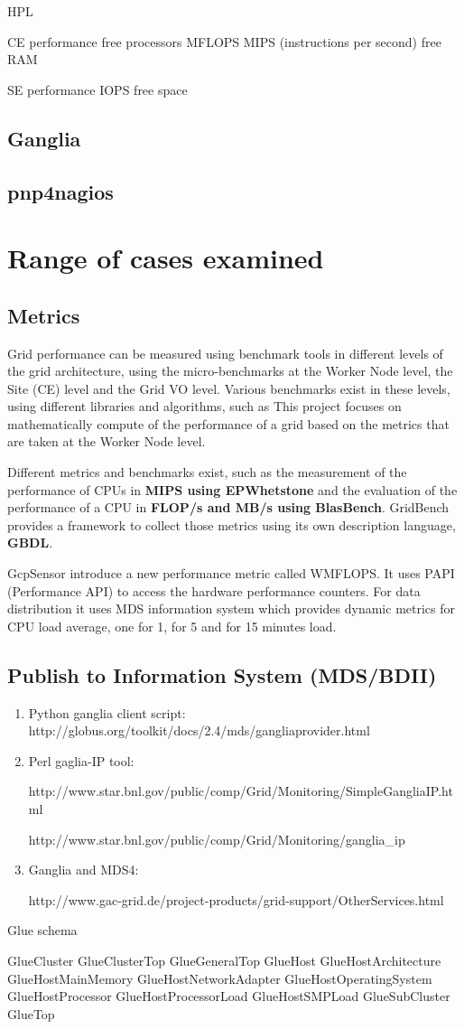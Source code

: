 HPL
\cite{gridbench}

CE performance
free processors
MFLOPS
MIPS (instructions per second)
free RAM

SE performance
IOPS
free space
\subsection{Ganglia}
\subsection{pnp4nagios}

\section{Range of cases examined}
\subsection{Metrics}

Grid performance can be measured using benchmark tools in different levels of
the grid architecture, using the micro-benchmarks at the Worker Node level, the
Site (CE) level and the Grid VO level. Various benchmarks exist in these
levels, using different libraries and algorithms, such as  This project focuses
on mathematically compute of the performance of a grid based on the metrics that are taken at the Worker Node level.

Different metrics and benchmarks exist, such as the measurement of
the performance of CPUs in {\bf MIPS using EPWhetstone} and the evaluation of
the performance of a CPU in {\bf FLOP/s and MB/s using BlasBench}. GridBench
\cite{gridbench} provides a framework to collect those metrics using its own
description language, {\bf GBDL}.

GcpSensor \cite{gcpsensor} introduce a new performance metric called WMFLOPS. It
uses PAPI \cite{papi} (Performance API) to access the hardware performance
counters. For data distribution it uses MDS information system which provides
dynamic metrics for CPU load average, one for 1, for 5 and for 15 minutes load.

\subsection{Publish to Information System (MDS/BDII)}
\begin{enumerate}
  \item Python ganglia client script:
  http://globus.org/toolkit/docs/2.4/mds/gangliaprovider.html
  \item Perl gaglia-IP tool:

  http://www.star.bnl.gov/public/comp/Grid/Monitoring/SimpleGangliaIP.html

  http://www.star.bnl.gov/public/comp/Grid/Monitoring/ganglia\_ip
  \item Ganglia and MDS4:

  http://www.gac-grid.de/project-products/grid-support/OtherServices.html
\end{enumerate}

Glue schema

GlueCluster
GlueClusterTop
GlueGeneralTop
GlueHost
GlueHostArchitecture
GlueHostMainMemory
GlueHostNetworkAdapter
GlueHostOperatingSystem
GlueHostProcessor
GlueHostProcessorLoad
GlueHostSMPLoad
GlueSubCluster
GlueTop
